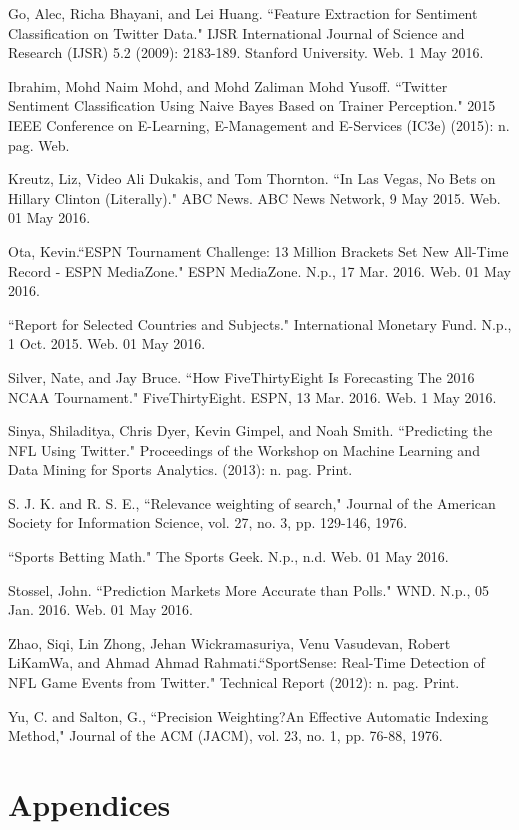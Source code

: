 \documentclass[12pt]{article}
\begin{document}
\begin{doublespacing}
Go, Alec, Richa Bhayani, and Lei Huang. ``Feature Extraction for Sentiment Classification 	on Twitter Data." IJSR International Journal of Science and Research (IJSR) 5.2 	(2009): 2183-189. Stanford University. Web. 1 May 2016.

Ibrahim, Mohd Naim Mohd, and Mohd Zaliman Mohd Yusoff. ``Twitter Sentiment 		Classification Using Naive Bayes Based on Trainer Perception." 2015 IEEE 		Conference on E-Learning, E-Management and E-Services (IC3e) (2015): n. pag. 	Web.

Kreutz, Liz, Video Ali Dukakis, and Tom Thornton. ``In Las Vegas, No Bets on Hillary 	Clinton (Literally)." ABC News. ABC News Network, 9 May 2015. Web. 01 May 		2016.

Ota, Kevin.``ESPN Tournament Challenge: 13 Million Brackets Set New All-Time Record - 	ESPN MediaZone." ESPN MediaZone. N.p., 17 Mar. 2016. Web. 01 May 2016.

``Report for Selected Countries and Subjects." International Monetary Fund. N.p., 1 Oct. 	2015. Web. 01 May 2016.

Silver, Nate, and Jay Bruce. ``How FiveThirtyEight Is Forecasting The 2016 NCAA 		Tournament." FiveThirtyEight. ESPN, 13 Mar. 2016. Web. 1 May 2016.

Sinya, Shiladitya, Chris Dyer, Kevin Gimpel, and Noah Smith. ``Predicting the NFL Using 	Twitter." Proceedings of the Workshop on Machine Learning and Data Mining for 	Sports Analytics. (2013): n. pag. Print.

S. J. K. and R. S. E., ``Relevance weighting of search," Journal of the American 		Society for Information Science, vol. 27, no. 3, pp. 129-146, 1976. 

``Sports Betting Math." The Sports Geek. N.p., n.d. Web. 01 May 2016.

Stossel, John. ``Prediction Markets More Accurate than Polls." WND. N.p., 05 Jan. 		2016. Web. 01 May 2016.

Zhao, Siqi, Lin Zhong, Jehan Wickramasuriya, Venu Vasudevan, Robert LiKamWa, and 	Ahmad Ahmad Rahmati.``SportSense: Real-Time Detection of NFL Game Events 	from Twitter." Technical Report (2012): n. pag. Print.

Yu, C. and Salton, G., ``Precision Weighting?An Effective Automatic Indexing Method," 	Journal of the ACM (JACM), vol. 23, no. 1, pp. 76-88, 1976. 

\newpage

\section{Appendices}


\end{doublespacing}
\end{document}
